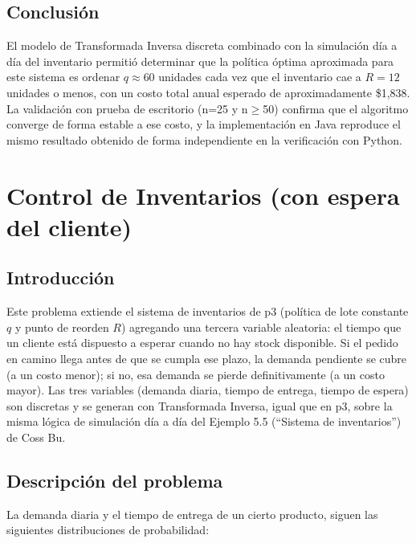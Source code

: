 \documentclass[12pt, a4paper]{article}
\begin{document}
\subsection{Conclusión}

El modelo de Transformada Inversa discreta combinado con la simulación día a día del inventario permitió determinar que la política óptima aproximada para este sistema es ordenar $q \approx 60$ unidades cada vez que el inventario cae a $R=12$ unidades o menos, con un costo total anual esperado de aproximadamente \$1,838. La validación con prueba de escritorio (n=25 y n$\geq$50) confirma que el algoritmo converge de forma estable a ese costo, y la implementación en Java reproduce el mismo resultado obtenido de forma independiente en la verificación con Python.


\newpage

\section{Control de Inventarios (con espera del cliente)}

\subsection{Introducción}

Este problema extiende el sistema de inventarios de p3 (política de lote constante $q$ y punto de reorden $R$) agregando una tercera variable aleatoria: el tiempo que un cliente está dispuesto a esperar cuando no hay stock disponible. Si el pedido en camino llega antes de que se cumpla ese plazo, la demanda pendiente se cubre (a un costo menor); si no, esa demanda se pierde definitivamente (a un costo mayor). Las tres variables (demanda diaria, tiempo de entrega, tiempo de espera) son discretas y se generan con Transformada Inversa, igual que en p3, sobre la misma lógica de simulación día a día del Ejemplo 5.5 (``Sistema de inventarios'') de Coss Bu.

\subsection{Descripción del problema}

La demanda diaria y el tiempo de entrega de un cierto producto, siguen las siguientes distribuciones de probabilidad:
\end{document}
